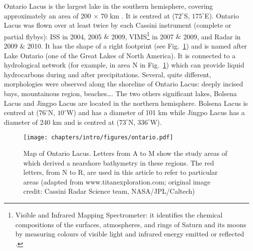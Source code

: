 Ontario Lacus is the largest lake in the southern hemisphere, covering approximately an area of 200 × 70 km \citep{wall2010active}. It is centred at ($72^\circ$S, $175^\circ$E). Ontario Lacus was flown over at least twice by each Cassini instrument (complete or partial flybys): ISS in 2004, 2005 $\&$ 2009, VIMS\footnote{Visible and Infrared Mapping Spectrometer: it identifies the chemical compositions of the surfaces, atmospheres, and rings of Saturn and its moons by measuring colours of visible light and infrared energy emitted or reflected \citep{brown2004cassini}.} in 2007 $\&$ 2009, and Radar in 2009 $\&$ 2010. It has the shape of a right footprint (see Fig.~\ref{fig:intro:ontario}) and is named after Lake Ontario (one of the Great Lakes of North America). It is connected to a hydrological network (for example, in area N in Fig.~\ref{fig:intro:ontario}) \citep{wall2010active, cornet2012geomorphological} which can provide liquid hydrocarbons during and after precipitations. Several, quite different, morphologies were observed along the shoreline of Ontario Lacus: deeply incised bays, mountainous region, beaches\dots \citep[see][for further details]{wall2010active, cornet2012geomorphological}. The two others significant lakes, Bolsena Lacus and Jingpo Lacus are located in the northern hemisphere. Bolsena Lacus is centred at ($76^\circ$N, $10^\circ$W) and has a diameter of 101 km while Jingpo Lacus has a diameter of 240 km and is centred at ($73^\circ$N, $336^\circ$W).

 \begin{figure}[H]
 \centering
 \texttt{[image: chapters/intro/figures/ontario.pdf]}
 \caption{Map of Ontario Lacus. Letters from A to M show the study areas of \citet{hayes2010bathymetry} which derived a nearshore bathymetry in these regions. The red letters, from N to R, are used in this article to refer to particular areas (adapted from www.titanexploration.com; original image credit: Cassini Radar Science team, NASA/JPL/Caltech) \label{fig:intro:ontario}}
 \end{figure}



